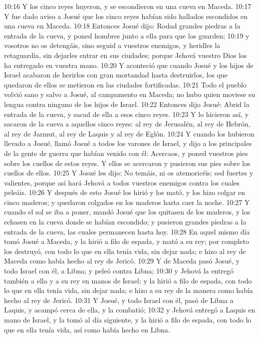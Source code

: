 10:16 Y los cinco reyes huyeron, y se escondieron en una cueva en Maceda.  
10:17 Y fue dado aviso a Josué que los cinco reyes habían sido hallados escondidos en una cueva en Maceda.  
10:18 Entonces Josué dijo: Rodad grandes piedras a la entrada de la cueva, y poned hombres junto a ella para que los guarden;  
10:19 y vosotros no os detengáis, sino seguid a vuestros enemigos, y heridles la retaguardia, sin dejarles entrar en sus ciudades; porque Jehová vuestro Dios los ha entregado en vuestra mano.  
10:20 Y aconteció que cuando Josué y los hijos de Israel acabaron de herirlos con gran mortandad hasta destruirlos, los que quedaron de ellos se metieron en las ciudades fortificadas.  
10:21 Todo el pueblo volvió sano y salvo a Josué, al campamento en Maceda; no hubo quien moviese su lengua contra ninguno de los hijos de Israel.  
10:22 Entonces dijo Josué: Abrid la entrada de la cueva, y sacad de ella a esos cinco reyes.  
10:23 Y lo hicieron así, y sacaron de la cueva a aquellos cinco reyes: al rey de Jerusalén, al rey de Hebrón, al rey de Jarmut, al rey de Laquis y al rey de Eglón.  
10:24 Y cuando los hubieron llevado a Josué, llamó Josué a todos los varones de Israel, y dijo a los principales de la gente de guerra que habían venido con él: Acercaos, y poned vuestros pies sobre los cuellos de estos reyes. Y ellos se acercaron y pusieron sus pies sobre los cuellos de ellos.  
10:25 Y Josué les dijo: No temáis, ni os atemoricéis; sed fuertes y valientes, porque así hará Jehová a todos vuestros enemigos contra los cuales peleáis.  
10:26 Y después de esto Josué los hirió y los mató, y los hizo colgar en cinco maderos; y quedaron colgados en los maderos hasta caer la noche.  
10:27 Y cuando el sol se iba a poner, mandó Josué que los quitasen de los maderos, y los echasen en la cueva donde se habían escondido; y pusieron grandes piedras a la entrada de la cueva, las cuales permanecen hasta hoy.  
10:28 En aquel mismo día tomó Josué a Maceda, y la hirió a filo de espada, y mató a su rey; por completo los destruyó, con todo lo que en ella tenía vida, sin dejar nada; e hizo al rey de Maceda como había hecho al rey de Jericó.  
10:29 Y de Maceda pasó Josué, y todo Israel con él, a Libna; y peleó contra Libna;  
10:30 y Jehová la entregó también a ella y a su rey en manos de Israel; y la hirió a filo de espada, con todo lo que en ella tenía vida, sin dejar nada; e hizo a su rey de la manera como había hecho al rey de Jericó.  
10:31 Y Josué, y todo Israel con él, pasó de Libna a Laquis, y acampó cerca de ella, y la combatió;  
10:32 y Jehová entregó a Laquis en mano de Israel, y la tomó al día siguiente, y la hirió a filo de espada, con todo lo que en ella tenía vida, así como había hecho en Libna.  
